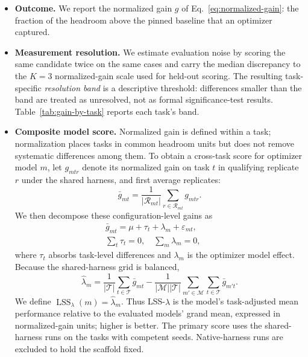 \begin{itemize}[itemsep=2pt,topsep=2pt,leftmargin=*]

  \item \textbf{Outcome.} We report the normalized gain $g$ of
  Eq.~\ref{eq:normalized-gain}: the fraction of the headroom above the pinned
  baseline that an optimizer captured.

  \item \textbf{Measurement resolution.} We estimate evaluation noise by
  scoring the same candidate twice on the same cases and carry the median
  discrepancy to the $K{=}3$ normalized-gain scale used for held-out scoring.
  The resulting task-specific \emph{resolution band} is a descriptive threshold:
  differences smaller than the band are treated as unresolved, not as formal
  significance-test results. Table~\ref{tab:gain-by-task} reports each task's
  band.

  \item \textbf{Composite model score.} Normalized gain is defined within a
task; normalization places tasks in common headroom units but does not remove
systematic differences among them. To obtain a cross-task score for optimizer
model $m$, let $g_{mtr}$ denote its normalized gain on task $t$ in qualifying
replicate $r$ under the shared harness, and first average replicates:
\begin{equation}
\bar{g}_{mt}
=
\frac{1}{|\mathcal{R}_{mt}|}
\sum_{r\in\mathcal{R}_{mt}} g_{mtr}.
\end{equation}
We then decompose these configuration-level gains as
\begin{align*}
\bar{g}_{mt}
=
\mu+\tau_t+\lambda_m+\varepsilon_{mt},
\qquad \\
\sum_t\tau_t=0,
\quad
\sum_m\lambda_m=0,
\label{eq:lss}
\end{align*}
where $\tau_t$ absorbs task-level differences and $\lambda_m$ is the optimizer
model effect. Because the shared-harness grid is balanced,
\begin{equation}
\widehat{\lambda}_m
=
\frac{1}{|\mathcal{T}|}\sum_{t\in\mathcal{T}}\bar{g}_{mt}
-
\frac{1}{|\mathcal{M}||\mathcal{T}|}
\sum_{m'\in\mathcal{M}}\sum_{t\in\mathcal{T}}\bar{g}_{m't}.
\end{equation}
We define
$\operatorname{LSS}_{\lambda}(m)=\widehat{\lambda}_m$. Thus
LSS-$\lambda$ is the model's task-adjusted mean performance relative to the
evaluated models' grand mean, expressed in normalized-gain units; higher is
better. The primary score uses the shared-harness runs on the tasks with
competent seeds. Native-harness runs are excluded to hold the scaffold fixed.

\end{itemize}

